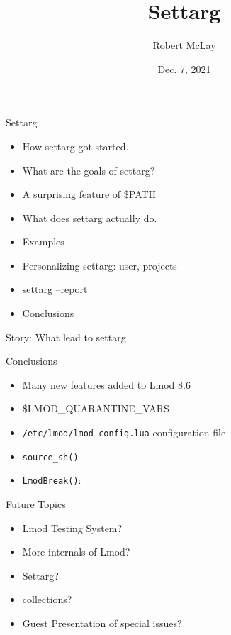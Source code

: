 \documentclass{beamer}
\begin{document}
\title[Lmod]{Settarg}
\author{Robert McLay} 
\date{Dec. 7, 2021}

\frame{\titlepage} 

\begin{frame}{Settarg}
  \begin{itemize}
    \item How settarg got started.
    \item What are the goals of settarg?
    \item A surprising feature of \$PATH
    \item What does settarg actually do.
    \item Examples
    \item Personalizing settarg: user, projects
    \item settarg --report
    \item Conclusions
  \end{itemize}
\end{frame}

\begin{frame}{Story: What lead to settarg}
  \begin{itemize}
    \item When processor speeds where measured in MHz and not GHz
    \item Worked in a lab that had incompatible architectures.
    \item Wanted to build programs w/o { in-between.
      \item 
  \end{itemize}
\end{frame}

\begin{frame}{Conclusions}
  \begin{itemize}
    \item Many new features added to Lmod 8.6
    \item \$LMOD\_QUARANTINE\_VARS
    \item \texttt{/etc/lmod/lmod\_config.lua} configuration file
    \item \texttt{source\_sh()} 
    \item \texttt{LmodBreak()}: 
  \end{itemize}
\end{frame}

\begin{frame}{Future Topics}
  \begin{itemize}
    \item Lmod Testing System?
    \item More internals of Lmod?
    \item Settarg?
    \item collections?
    \item Guest Presentation of special issues?
  \end{itemize}
\end{frame}
\end{document}
